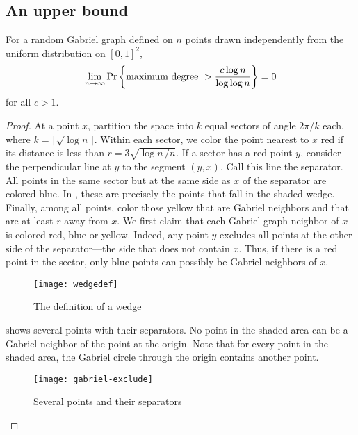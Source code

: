 \documentclass[lotsofwhite,charterfonts]{patmorin}
\newcommand{\PROB}{\Pr}
\begin{document}
\subsection{An upper bound}

\begin{thm}
For a random Gabriel graph defined on $n$ points drawn
independently from the uniform distribution on
$[0,1]^2$, 
\[
\lim_{n\to\infty} \PROB \left\{ \hbox{\rm maximum degree}~> {c \log n \over
\log \log n} \right\} = 0
\]
for all $c > 1$.
\end{thm}

\begin{proof}
At a point $x$, partition the space into $k$ equal
sectors of angle $2\pi/k$ each, where $k = \lceil \sqrt{\log n} \rceil$.
Within each sector, we color the point nearest to $x$ 
red if its distance is less than $r = 3 \sqrt{\log n\, /n}$.
If a sector has a red point $y$, consider the perpendicular
line at $y$ to the segment $(y,x)$. Call this
line the separator. All points
in the same sector but at the same side as $x$ of the separator
are colored blue. In , these are precisely the points that
fall in the shaded wedge.
Finally, among all points, color those yellow that are
Gabriel neighbors and that are at least $r$ away from $x$.
We first claim that each Gabriel graph neighbor of $x$
is colored red, blue or yellow.
Indeed, any point $y$ excludes all points at the
other side of the separator---the side that does not contain $x$.
Thus, if there is a red point in the sector, only blue points
can possibly be Gabriel neighbors of $x$.


\begin{figure}
\begin{center}\texttt{[image: wedgedef]}\end{center}
\caption{The definition of a wedge}
\end{figure}

 shows several points with their separators.
No point in the shaded area can be a Gabriel neighbor of the point at the
origin. Note that for every point in the shaded area, the Gabriel circle
through the origin contains another point.

\begin{figure}
\begin{center}\texttt{[image: gabriel-exclude]}\end{center}
\caption{Several points and their separators}
\end{figure}


\end{proof}
\end{document}

